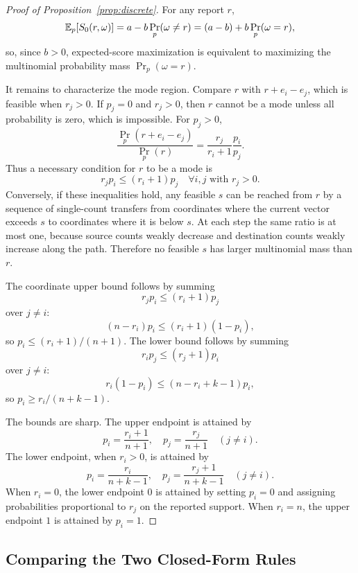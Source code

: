 \begin{proof}[Proof of Proposition~\ref{prop:discrete}]
For any report \(r\),
\[
\mathbb{E}_p[S_0(r,\omega)]
=
a-b\Pr_p(\omega\ne r)
=
(a-b)+b\Pr_p(\omega=r),
\]
so, since \(b>0\), expected-score maximization is equivalent to maximizing the multinomial probability mass \(\Pr_p(\omega=r)\).

It remains to characterize the mode region.
Compare \(r\) with \(r+e_i-e_j\), which is feasible when \(r_j>0\).
If \(p_j=0\) and \(r_j>0\), then \(r\) cannot be a mode unless all probability is zero, which is impossible.
For \(p_j>0\),
\[
\frac{\Pr_p(r+e_i-e_j)}{\Pr_p(r)}
=
\frac{r_j}{r_i+1}\frac{p_i}{p_j}.
\]
Thus a necessary condition for \(r\) to be a mode is
\[
r_jp_i\le (r_i+1)p_j
\quad
\forall i,j\text{ with }r_j>0.
\]
Conversely, if these inequalities hold, any feasible \(s\) can be reached from \(r\) by a sequence of single-count transfers from coordinates where the current vector exceeds \(s\) to coordinates where it is below \(s\).
At each step the same ratio is at most one, because source counts weakly decrease and destination counts weakly increase along the path.
Therefore no feasible \(s\) has larger multinomial mass than \(r\).

The coordinate upper bound follows by summing
\[
r_jp_i\le (r_i+1)p_j
\]
over \(j\ne i\):
\[
(n-r_i)p_i\le (r_i+1)(1-p_i),
\]
so \(p_i\le (r_i+1)/(n+1)\).
The lower bound follows by summing
\[
r_ip_j\le (r_j+1)p_i
\]
over \(j\ne i\):
\[
r_i(1-p_i)\le (n-r_i+k-1)p_i,
\]
so \(p_i\ge r_i/(n+k-1)\).

The bounds are sharp.
The upper endpoint is attained by
\[
p_i=\frac{r_i+1}{n+1},
\quad
p_j=\frac{r_j}{n+1}\quad(j\ne i).
\]
The lower endpoint, when \(r_i>0\), is attained by
\[
p_i=\frac{r_i}{n+k-1},
\quad
p_j=\frac{r_j+1}{n+k-1}\quad(j\ne i).
\]
When \(r_i=0\), the lower endpoint \(0\) is attained by setting \(p_i=0\) and assigning probabilities proportional to \(r_j\) on the reported support.
When \(r_i=n\), the upper endpoint \(1\) is attained by \(p_i=1\).
\end{proof}

\subsection{Comparing the Two Closed-Form Rules}
\label{app:comparison-proof}

